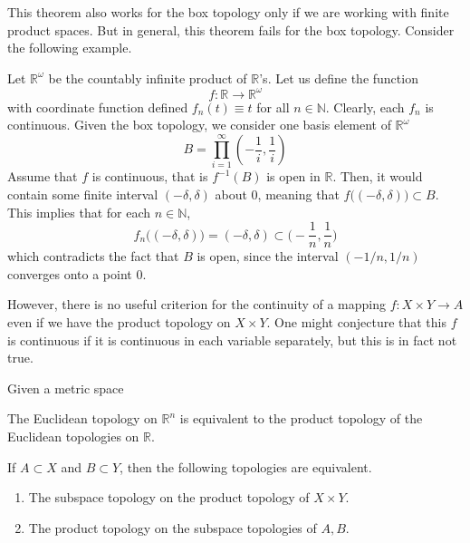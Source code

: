   This theorem also works for the box topology only if we are working with finite product spaces. But in general, this theorem fails for the box topology. Consider the following example. 

  \begin{example}
    Let $\mathbb{R}^\omega$ be the countably infinite product of $\mathbb{R}$'s. Let us define the function 
    \begin{equation}
      f: \mathbb{R} \rightarrow \mathbb{R}^\omega
    \end{equation}
    with coordinate function defined $f_n (t) \equiv t$ for all $n \in \mathbb{N}$. Clearly, each $f_n$ is continuous. Given the box topology, we consider one basis element of $\mathbb{R}^\omega$
    \begin{equation}
      B = \prod_{i=1}^\infty (-\frac{1}{i}, \frac{1}{i})
    \end{equation}
    Assume that $f$ is continuous, that is $f^{-1}(B)$ is open in $\mathbb{R}$. Then, it would contain some finite interval $(-\delta, \delta)$ about $0$, meaning that $f\big( (-\delta, \delta)\big) \subset B$. This implies that for each $n \in \mathbb{N}$, 
    \begin{equation}
      f_n \big( (-\delta, \delta) \big) = (-\delta, \delta) \subset \Big( -\frac{1}{n}, \frac{1}{n} \Big)
    \end{equation}
    which contradicts the fact that $B$ is open, since the interval $(-1/n, 1/n)$ converges onto a point $0$. 
  \end{example}

  However, there is no useful criterion for the continuity of a mapping $f: X \times Y \longrightarrow A$ even if we have the product topology on $X \times Y$. One might conjecture that this $f$ is continuous if it is continuous in each variable separately, but this is in fact not true. 

  \begin{theorem}
    Given a metric space
  \end{theorem}

  \begin{corollary}
    The Euclidean topology on $\mathbb{R}^n$ is equivalent to the product topology of the Euclidean topologies on $\mathbb{R}$. 
  \end{corollary} 

  \begin{theorem}
    If $A \subset X$ and $B \subset Y$, then the following topologies are equivalent. 
    \begin{enumerate}
      \item The subspace topology on the product topology of $X \times Y$. 
      \item The product topology on the subspace topologies of $A, B$. 
    \end{enumerate}
  \end{theorem}

